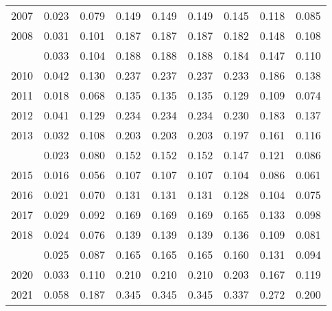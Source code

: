 \documentclass[
]{article}
\begin{document}
\begin{longtable}[t]{lrrrrrrrr}
2007 & 0.023 & 0.079 & 0.149 & 0.149 & 0.149 & 0.145 & 0.118 & 0.085\\
2008 & 0.031 & 0.101 & 0.187 & 0.187 & 0.187 & 0.182 & 0.148 & 0.108\\
\addlinespace
2009 & 0.033 & 0.104 & 0.188 & 0.188 & 0.188 & 0.184 & 0.147 & 0.110\\
2010 & 0.042 & 0.130 & 0.237 & 0.237 & 0.237 & 0.233 & 0.186 & 0.138\\
2011 & 0.018 & 0.068 & 0.135 & 0.135 & 0.135 & 0.129 & 0.109 & 0.074\\
2012 & 0.041 & 0.129 & 0.234 & 0.234 & 0.234 & 0.230 & 0.183 & 0.137\\
2013 & 0.032 & 0.108 & 0.203 & 0.203 & 0.203 & 0.197 & 0.161 & 0.116\\
\addlinespace
2014 & 0.023 & 0.080 & 0.152 & 0.152 & 0.152 & 0.147 & 0.121 & 0.086\\
2015 & 0.016 & 0.056 & 0.107 & 0.107 & 0.107 & 0.104 & 0.086 & 0.061\\
2016 & 0.021 & 0.070 & 0.131 & 0.131 & 0.131 & 0.128 & 0.104 & 0.075\\
2017 & 0.029 & 0.092 & 0.169 & 0.169 & 0.169 & 0.165 & 0.133 & 0.098\\
2018 & 0.024 & 0.076 & 0.139 & 0.139 & 0.139 & 0.136 & 0.109 & 0.081\\
\addlinespace
2019 & 0.025 & 0.087 & 0.165 & 0.165 & 0.165 & 0.160 & 0.131 & 0.094\\
2020 & 0.033 & 0.110 & 0.210 & 0.210 & 0.210 & 0.203 & 0.167 & 0.119\\
2021 & 0.058 & 0.187 & 0.345 & 0.345 & 0.345 & 0.337 & 0.272 & 0.200\\*
\end{longtable}
\end{document}
